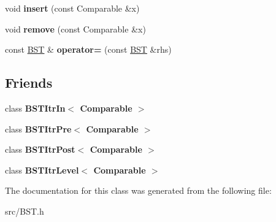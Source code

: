 \begin{DoxyCompactItemize}
\item 
\hypertarget{singleton_b_s_t_a2b117df6521c7d61dac75ff2c938bae7}{void {\bfseries insert} (const Comparable \&x)}\label{singleton_b_s_t_a2b117df6521c7d61dac75ff2c938bae7}

\item 
\hypertarget{singleton_b_s_t_a6f01a0b44daf82a42022b6eb4c0df7a2}{void {\bfseries remove} (const Comparable \&x)}\label{singleton_b_s_t_a6f01a0b44daf82a42022b6eb4c0df7a2}

\item 
\hypertarget{singleton_b_s_t_aa80c39f454c89d4a202be3d1445823f3}{const \hyperlink{singleton_b_s_t}{B\+S\+T} \& {\bfseries operator=} (const \hyperlink{singleton_b_s_t}{B\+S\+T} \&rhs)}\label{singleton_b_s_t_aa80c39f454c89d4a202be3d1445823f3}

\end{DoxyCompactItemize}
\subsection*{Friends}
\begin{DoxyCompactItemize}
\item 
\hypertarget{singleton_b_s_t_aab3993acac2ab24a0b59edb0c3acc775}{class {\bfseries B\+S\+T\+Itr\+In$<$ Comparable $>$}}\label{singleton_b_s_t_aab3993acac2ab24a0b59edb0c3acc775}

\item 
\hypertarget{singleton_b_s_t_a45a55df6f11541416d4ea7684c575c1a}{class {\bfseries B\+S\+T\+Itr\+Pre$<$ Comparable $>$}}\label{singleton_b_s_t_a45a55df6f11541416d4ea7684c575c1a}

\item 
\hypertarget{singleton_b_s_t_a5dc153694be266f6e772659486219da7}{class {\bfseries B\+S\+T\+Itr\+Post$<$ Comparable $>$}}\label{singleton_b_s_t_a5dc153694be266f6e772659486219da7}

\item 
\hypertarget{singleton_b_s_t_a26ff00bc0d87069aed877f10fd3c80a8}{class {\bfseries B\+S\+T\+Itr\+Level$<$ Comparable $>$}}\label{singleton_b_s_t_a26ff00bc0d87069aed877f10fd3c80a8}

\end{DoxyCompactItemize}


The documentation for this class was generated from the following file\+:\begin{DoxyCompactItemize}
\item 
src/B\+S\+T.\+h\end{DoxyCompactItemize}
